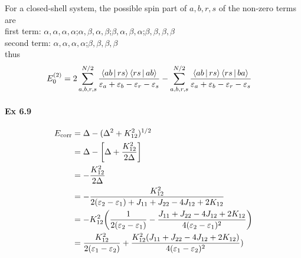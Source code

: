 \documentclass[a4paper]{article}
\DeclareMathOperator{\corr}{\mathrm{corr}}
\newcommand{\ex}[1]{\paragraph{Ex #1}}
\numberwithin{equation}{subsection}
\begin{document}
For a closed-shell system, the possible spin part of $ a,b,r,s $ of the non-zero terms are\\
first term: $ \alpha,\alpha,\alpha,\alpha $;\quad $ \alpha,\beta,\alpha,\beta $;\quad $ \beta,\alpha,\beta,\alpha $;\quad $ \beta,\beta,\beta,\beta $\\
second term: $ \alpha,\alpha,\alpha,\alpha $;\quad $ \beta,\beta,\beta,\beta $\\
thus
\begin{align}
E_0^{(2)} &= 2\sum_{a,b,r,s}^{N/2}
\dfrac{\Braket{ab|rs}\Braket{rs|ab}}{\varepsilon_a + \varepsilon_b - \varepsilon_r - \varepsilon_s}
- \sum_{a,b,r,s}^{N/2}
\dfrac{\Braket{ab|rs}\Braket{rs|ba}}{\varepsilon_a + \varepsilon_b - \varepsilon_r - \varepsilon_s}
\end{align}

\ex{6.9}
\begin{align}
E_{\corr} &= \Delta - (\Delta^2 + K_{12}^2)^{1/2} \notag\\
&= \Delta - \qty[\Delta + \dfrac{K_{12}^2}{2\Delta}] \notag\\
&= - \dfrac{K_{12}^2}{2\Delta} \notag\\
&= - \dfrac{K_{12}^2}{2(\varepsilon_2-\varepsilon_1) + J_{11} + J_{22} - 4J_{12} + 2K_{12}} \notag\\
&= - K_{12}^2 \qty(\dfrac{1}{2(\varepsilon_2-\varepsilon_1)} - \dfrac{ J_{11} + J_{22} - 4J_{12} + 2K_{12}}{4(\varepsilon_2-\varepsilon_1)^2}) \notag\\
&= \dfrac{K_{12}^2}{2(\varepsilon_1-\varepsilon_2)} + \dfrac{K_{12}^2 (J_{11} + J_{22} - 4J_{12} + 2K_{12})}{4(\varepsilon_1-\varepsilon_2)^2})
\end{align}
\end{document}
